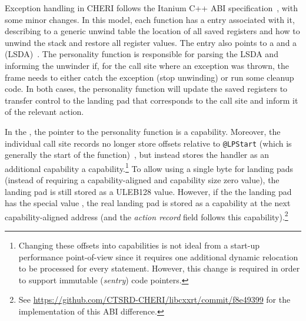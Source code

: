 Exception handling in CHERI follows the Itanium C++ ABI specification~\cite{noauthor_ABIItaniumException_2018}, with some minor changes.
In this model, each function has a  entry associated with it, describing to a generic unwind table the location of all saved registers and how to unwind the stack and restore all register values.
The  entry also points to a  and a  (LSDA)~\cite{Hewlett-Packard_ExceptionHandlingTables_1999}.
The personality function is responsible for parsing the LSDA and informing the unwinder if, for the call site where an exception was thrown, the frame needs to either catch the exception (stop unwinding) or run some cleanup code.
In both cases, the personality function will update the saved registers to transfer control to the landing pad that corresponds to the call site and inform it of the relevant action.

In the \purecapABI{}, the pointer to the personality function is a capability.
Moreover, the individual call site records no longer store offsets relative to \texttt{@LPStart} (which is generally the start of the function)~\cite[\S{}7.3.2]{Hewlett-Packard_ExceptionHandlingTables_1999}, but instead stores the handler as an additional capability a capability.\footnote{%
  Changing these offsets into capabilities is not ideal from a start-up performance point-of-view since it requires one additional dynamic relocation to be processed for every  statement.
  However, this change is required in order to support immutable (\textit{sentry}) code pointers.}
To allow using a single byte for  landing pads (instead of requiring a capability-aligned and capability size zero value), the landing pad is still stored as a ULEB128 value.
However, if the the landing pad has the special value , the real landing pad is stored as a capability at the next capability-aligned address (and the \textit{action record} field follows this capability).\footnote{%
  See \url{https://github.com/CTSRD-CHERI/libcxxrt/commit/f8e49399} for the  implementation of this ABI difference.}


